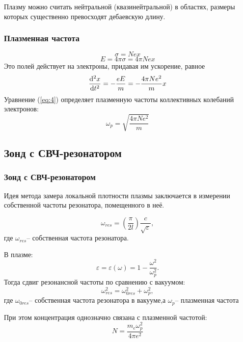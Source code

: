 \documentclass[10pt,pdf,hyperref={unicode}, dvipsnames]{beamer}
\begin{document}
\begin{frame}
\begin{frame}[t]
    $$\,$$

    Плазму можно считать нейтральной (квазинейтральной) в областях, размеры которых существенно превосходят дебаевскую длину.
\end{frame}
\begin{frame}[t]\frametitle{Плазменная частота}
\begin{equation}
	\sigma = Nex
\end{equation}
\begin{equation}
	E=4\pi\sigma=4\pi Nex
\end{equation}
Это полей действует на электроны, придавая им ускорение, равное
\begin{equation}
	\label{eq:4}
	\dv[2]{x}{t}=-\frac{eE}{m}=-\frac{4\pi N e^2}{m}x
\end{equation}
Уравнение (\ref{eq:4}) определяет плазменную частоты коллективных колебаний электронов:
\begin{equation}
	\omega_p=\sqrt{\frac{4\pi N e^2}{m}}
\end{equation}



\end{frame}


\subsection{Зонд с СВЧ-резонатором} %

\begin{frame}
	\frametitle{Зонд с СВЧ-резонатором}
	Идея метода замера локальной  плотности плазмы заключается в измерении собственной частоты резонатора, помещенного в неё.

	\begin{equation}
		\omega_{res}=\left(\frac\pi{2l}\right)\frac c{\sqrt{\varepsilon}},
	\end{equation}
	где $\omega_{res}$-- собственная частота резонатора.

	В плазме: $$\varepsilon=\varepsilon(\omega)=1-\frac{\omega^2}{\omega_p^2}.$$ 
	Тогда сдвиг резонансной частоты по сравнению с вакуумом:
	$$\omega_{res}^2=\omega_{0res}^2+\omega_p^2,$$ 
	где $\omega_{0res}$-- собственная частота резонатора в вакууме,а $\omega_p$-- плазменная частота

	При этом концентрация однозначно связана с плазменной частотой:
	\begin{equation}
		N=\frac{m_e\omega^2_p}{4\pi e^2}
	\end{equation}
\end{frame}



\end{frame}
\end{document}

